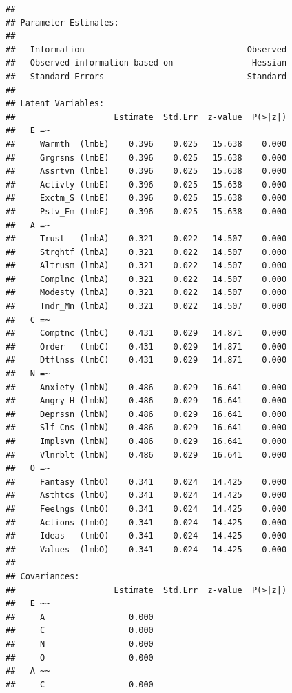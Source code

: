 \documentclass{article}\usepackage[]{graphicx}\usepackage[]{color}
\makeatletter
\newenvironment{kframe}{%
 \def\at@end@of@kframe{}%
 \ifinner\ifhmode%
  \def\at@end@of@kframe{\end{minipage}}%
  \begin{minipage}{\columnwidth}%
 \fi\fi%
 \def\FrameCommand##1{\hskip\@totalleftmargin \hskip-\fboxsep
 \colorbox{shadecolor}{##1}\hskip-\fboxsep
     \hskip-\linewidth \hskip-\@totalleftmargin \hskip\columnwidth}%
 \MakeFramed {\advance\hsize-\width
   \@totalleftmargin\z@ \linewidth\hsize
   \@setminipage}}%
 {\par\unskip\endMakeFramed%
 \at@end@of@kframe}
\newenvironment{knitrout}{}{} %
\makeatother
\begin{document}
\begin{knitrout}
\begin{kframe}
\begin{verbatim}
## 
## Parameter Estimates:
## 
##   Information                                 Observed
##   Observed information based on                Hessian
##   Standard Errors                             Standard
## 
## Latent Variables:
##                    Estimate  Std.Err  z-value  P(>|z|)
##   E =~                                                
##     Warmth  (lmbE)    0.396    0.025   15.638    0.000
##     Grgrsns (lmbE)    0.396    0.025   15.638    0.000
##     Assrtvn (lmbE)    0.396    0.025   15.638    0.000
##     Activty (lmbE)    0.396    0.025   15.638    0.000
##     Exctm_S (lmbE)    0.396    0.025   15.638    0.000
##     Pstv_Em (lmbE)    0.396    0.025   15.638    0.000
##   A =~                                                
##     Trust   (lmbA)    0.321    0.022   14.507    0.000
##     Strghtf (lmbA)    0.321    0.022   14.507    0.000
##     Altrusm (lmbA)    0.321    0.022   14.507    0.000
##     Complnc (lmbA)    0.321    0.022   14.507    0.000
##     Modesty (lmbA)    0.321    0.022   14.507    0.000
##     Tndr_Mn (lmbA)    0.321    0.022   14.507    0.000
##   C =~                                                
##     Comptnc (lmbC)    0.431    0.029   14.871    0.000
##     Order   (lmbC)    0.431    0.029   14.871    0.000
##     Dtflnss (lmbC)    0.431    0.029   14.871    0.000
##   N =~                                                
##     Anxiety (lmbN)    0.486    0.029   16.641    0.000
##     Angry_H (lmbN)    0.486    0.029   16.641    0.000
##     Deprssn (lmbN)    0.486    0.029   16.641    0.000
##     Slf_Cns (lmbN)    0.486    0.029   16.641    0.000
##     Implsvn (lmbN)    0.486    0.029   16.641    0.000
##     Vlnrblt (lmbN)    0.486    0.029   16.641    0.000
##   O =~                                                
##     Fantasy (lmbO)    0.341    0.024   14.425    0.000
##     Asthtcs (lmbO)    0.341    0.024   14.425    0.000
##     Feelngs (lmbO)    0.341    0.024   14.425    0.000
##     Actions (lmbO)    0.341    0.024   14.425    0.000
##     Ideas   (lmbO)    0.341    0.024   14.425    0.000
##     Values  (lmbO)    0.341    0.024   14.425    0.000
## 
## Covariances:
##                    Estimate  Std.Err  z-value  P(>|z|)
##   E ~~                                                
##     A                 0.000                           
##     C                 0.000                           
##     N                 0.000                           
##     O                 0.000                           
##   A ~~                                                
##     C                 0.000                           

\end{verbatim}
\end{kframe}
\end{knitrout}
\end{document}
